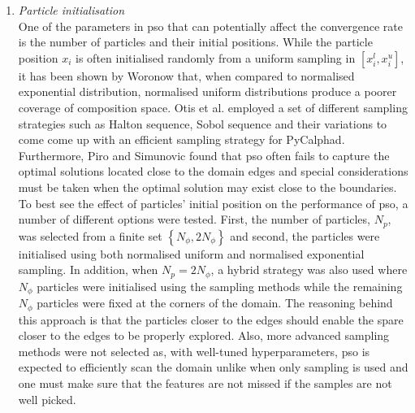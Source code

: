 \begin{enumerate}
		\item \emph{Particle initialisation}\\
			One of the parameters in \gls{pso} that can potentially affect the convergence rate is the number of particles and their initial positions. While the particle position $x_i$ is often initialised randomly from a uniform sampling in $\left[ x_i^l, x_i^u\right]$, it has been shown by Woronow \cite{Woronow:1993aa} that, when compared to normalised exponential distribution, normalised uniform distributions produce a poorer coverage of composition space. Otis et al. \cite{Otis:2017ab} employed a set of different sampling strategies such as Halton sequence, Sobol sequence and their variations to come come up with an efficient sampling strategy for PyCalphad. Furthermore, Piro and Simunovic \cite{Piro16} found that \gls{pso} often fails to capture the optimal solutions located close to the domain edges and special considerations must be taken when the optimal solution may exist close to the boundaries. To best see the effect of particles' initial position on the performance of \gls{pso}, a number of different options were tested. First, the number of particles, $N_p$, was selected from a finite set $\left\{ N_\phi, 2N_\phi\right\}$ and second, the particles were initialised using both normalised uniform and normalised exponential sampling. In addition, when $N_p = 2N_\phi$, a hybrid strategy was also used where $N_\phi$ particles were initialised using the sampling methods while the remaining $N_\phi$ particles were fixed at the corners of the domain. The reasoning behind this approach is that the particles closer to the edges should enable the spare closer to the edges to be properly explored. Also, more advanced sampling methods were not selected as, with well-tuned hyperparameters, \gls{pso} is expected to efficiently scan the domain unlike when only sampling is used and one must make sure that the features are not missed if the samples are not well picked. 


\end{enumerate}
